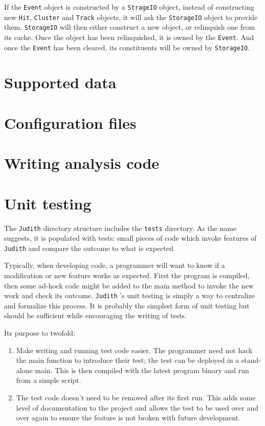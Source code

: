 \documentclass[10pt,a4paper]{book}
\newcommand{\Judith}{\Verb`Judith` }
\begin{document}
If the \Verb`Event` object is constructed by a \Verb`StrageIO` object, instead of constructing new \Verb`Hit`, \Verb`Cluster` and \Verb`Track` objects, it will ask the \Verb`StorageIO` object to provide them. \Verb`StorageIO` will then either construct a new object, or relinquish one from its cache. Once the object has been relinquished, it is owned by the \Verb`Event`. And once the \Verb`Event` has been cleared, its constituents will be owned by \Verb`StorageIO`.

\chapter{Supported data}

\chapter{Configuration files}

\chapter{Writing analysis code}

\chapter{Unit testing}
\label{ch:unittesting}

The \Judith directory structure includes the \Verb`tests` directory. As the name suggests, it is populated with tests: small pieces of code which invoke features of \Judith and compare the outcome to what is expected.

Typically, when developing code, a programmer will want to know if a modification or new feature works as expected. First the program is compiled, then some ad-hock code might be added to the main method to invoke the new work and check its outcome. \Judith's unit testing is simply a way to centralize and formalize this process. It is probably the simplest form of unit testing but should be sufficient while encouraging the writing of tests.

Its purpose to twofold:

\begin{enumerate}
	\item Make writing and running test code easier. The programmer need not hack the main function to introduce their test; the test can be deployed in a stand-alone main. This is then compiled with the latest program binary and run from a simple script.
	\item The test code doesn't need to be removed after its first run. This adds some level of documentation to the project and allows the test to be used over and over again to ensure the feature is not broken with future development.
\end{enumerate}
\end{document}
